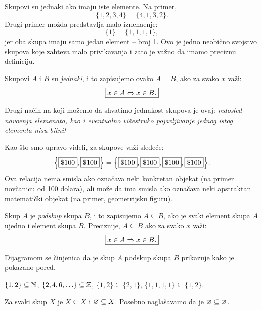Skupovi su jednaki ako imaju iste elemente. Na primer,
$$
  \{ 1, 2, 3, 4 \} = \{ 4, 1, 3, 2 \}.
$$
Drugi primer mo\v zda predstavlja malo iznena\dj enje:
$$
  \{1\} = \{1, 1, 1, 1\},
$$
jer oba skupa imaju samo jedan element -- broj 1. Ovo je jedno neobi\v cno svojstvo skupova koje zahteva malo privikavanja
i zato je va\v zno da imamo preciznu definiciju.

\begin{DEF}
  Skupovi $A$ i $B$ su \emph{jednaki}, i to zapisujemo ovako $A = B$, ako za svako $x$ va\v zi:
  $$
    \fbox{$x \in A \Leftrightarrow x \in B.$}
  $$
\end{DEF}


Drugi na\v cin na koji mo\v zemo da shvatimo jednakost skupova je ovaj: \emph{redosled navo\dj enja
elemenata, kao i eventualno vi\v sestruko pojavljivanje jednog istog elementa nisu bitni!}

Kao \v sto smo upravo videli, za skupove va\v zi slede\'ce:
$$
  \Big\{\fbox{\$100}, \fbox{\$100}\Big\} = \Big\{\fbox{\$100}, \fbox{\$100}, \fbox{\$100}, \fbox{\$100}\Big\}.
$$
Ova relacija nema smisla ako  ozna\v cava neki konkretan objekat (na primer nov\v canicu od 100 dolara),
ali mo\v ze da ima smisla ako  ozna\v cava neki apstraktan matemati\v cki objekat (na primer, geometrijsku figuru).

\medskip

\noindent
\begin{minipage}{3in}
  \begin{DEF}
  Skup $A$ je \emph{podskup} skupa $B$, i to zapisujemo $A \subseteq B$, ako je svaki element skupa $A$ ujedno i element
  skupa $B$. Preciznije, $A \subseteq B$ ako za svako $x$ va\v zi:
  $$
    \fbox{$x \in A \Rightarrow x \in B.$}
  $$
  \end{DEF}
  Dijagramom se \v cinjenica da je skup $A$ podskup skupa $B$ prikazuje kako je pokazano pored.
\end{minipage}
\hfill
\begin{minipage}{2.5in}
  \begin{center}
    
  \end{center}
\end{minipage}

\begin{EX}
  $\{1, 2\} \subseteq \mathbb{N}$, $\{2, 4, 6, \ldots \} \subseteq \mathbb{Z}$, $\{1, 2\} \subseteq \{2, 1\}$, $\{1, 1, 1, 1\} \subseteq \{1, 2\}$.
\end{EX}

\begin{EX}
  Za svaki skup $X$ je $X \subseteq X$ i $\varnothing \subseteq X$. Posebno nagla\v savamo da je $\varnothing \subseteq \varnothing$.
\end{EX}

